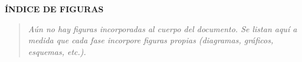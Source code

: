 \vspace{1.5em}

\begin{center}
    {\Large\bfseries ÍNDICE DE FIGURAS}
\end{center}
\vspace{0.5em}
\begin{quote}
    \centering\color{colorTextoGris}\textit{Aún no hay figuras incorporadas al cuerpo del documento. Se listan aquí a medida que cada fase incorpore figuras propias (diagramas, gráficos, esquemas, etc.).}
\end{quote}

\vspace{2.5em}
\onehalfspacing